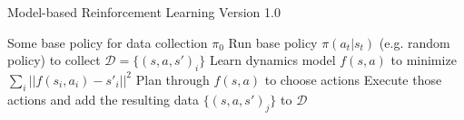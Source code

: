 \begin{algorithm}[t!]
\caption{Model-based Reinforcement Learning Version 1.0}
\begin{algorithmic}[1]
\label{alg:mb10}
\REQUIRE Some base policy for data collection $\pi_0$
\STATE Run base policy $\pi(a_t|s_t)$ (e.g. random policy) to collect $\mathcal{D} = \{(s,a,s')_i\}$
\STATE Learn dynamics model $f(s,a)$ to minimize $\sum_i\lvert|f(s_i,a_i)-s'_i|\rvert^2$
\STATE Plan through $f(s,a)$ to choose actions
\STATE Execute those actions and add the resulting data $\{(s,a,s')_j\}$ to $\mathcal{D}$
\ENDWHILE
\end{algorithmic}
\end{algorithm}